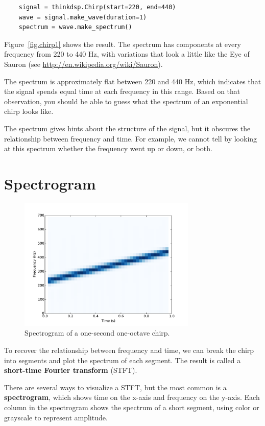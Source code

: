 \documentclass[12pt]{book}
\begin{document}
\begin{verbatim}
    signal = thinkdsp.Chirp(start=220, end=440)
    wave = signal.make_wave(duration=1)
    spectrum = wave.make_spectrum()
\end{verbatim}

Figure~\ref{fig.chirp1} shows the result.  The spectrum has
components at every frequency from 220 to 440 Hz, with variations
that look a little like the Eye of Sauron
(see \url{http://en.wikipedia.org/wiki/Sauron}).

The spectrum is approximately flat between 220 and 440 Hz, which
indicates that the signal spends equal time at each frequency in this
range.  Based on that observation, you should be able to guess what
the spectrum of an exponential chirp looks like.

The spectrum gives hints about the structure of the signal,
but it obscures the relationship between frequency and time.
For example, we cannot tell by looking at this spectrum whether
the frequency went up or down, or both.


\section{Spectrogram}

\begin{figure}
\centerline{\includegraphics[height=2.5in]{figs/chirp2.pdf}}
\caption{Spectrogram of a one-second one-octave chirp.}
\label{fig.chirp2}
\end{figure}

To recover the relationship between frequency and time, we can break
the chirp into segments and plot the spectrum of each segment.  The
result is called a {\bf short-time Fourier transform} (STFT).

There are several ways to visualize a STFT, but the most common
is a {\bf spectrogram}, which shows time on the x-axis and frequency
on the y-axis.  Each column in the spectrogram shows the spectrum of
a short segment, using color or grayscale to represent amplitude.
\end{document}
